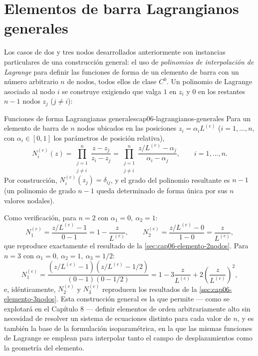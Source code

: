 \section{Elementos de barra Lagrangianos generales}
\label{sec:cap06-lagrangianos}

Los casos de dos y tres nodos desarrollados anteriormente son instancias particulares de una construcción general: el uso de \emph{polinomios de interpolación de Lagrange} para definir las funciones de forma de un elemento de barra con un número arbitrario $n$ de nodos, todos ellos de clase $C^0$. Un polinomio de Lagrange asociado al nodo $i$ se construye exigiendo que valga $1$ en $z_i$ y $0$ en los restantes $n-1$ nodos $z_j$ ($j\neq i$):

\begin{ecnimportante}{Funciones de forma Lagrangianas generales}{cap06-lagrangianos-generales}
Para un elemento de barra de $n$ nodos ubicados en las posiciones $z_i = \alpha_i L^{(e)}$ ($i=1,\dots,n$, con $\alpha_i\in[0,1]$ los parámetros de posición relativa),
\[
N_i^{(e)}(z) = \prod_{\substack{j=1 \\ j\neq i}}^{n} \frac{z-z_j}{z_i-z_j} = \prod_{\substack{j=1\\j\neq i}}^{n} \frac{z/L^{(e)}-\alpha_j}{\alpha_i-\alpha_j}, \qquad i=1,\dots,n .
\]
Por construcción, $N_i^{(e)}(z_j)=\delta_{ij}$, y el grado del polinomio resultante es $n-1$ (un polinomio de grado $n-1$ queda determinado de forma única por sus $n$ valores nodales).
\end{ecnimportante}

Como verificación, para $n=2$ con $\alpha_1=0,\ \alpha_2=1$:
\[
N_1^{(e)} = \frac{z/L^{(e)}-1}{0-1} = 1-\frac{z}{L^{(e)}}, \qquad N_2^{(e)}=\frac{z/L^{(e)}-0}{1-0}=\frac{z}{L^{(e)}} ,
\]
que reproduce exactamente el resultado de la \cref{sec:cap06-elemento-2nodos}. Para $n=3$ con $\alpha_1=0,\ \alpha_2=1,\ \alpha_3=1/2$:
\[
N_1^{(e)} = \frac{\left(z/L^{(e)}-1\right)\left(z/L^{(e)}-1/2\right)}{(0-1)(0-1/2)} = 1-3\frac{z}{L^{(e)}}+2\left(\frac{z}{L^{(e)}}\right)^2 ,
\]
e, idénticamente, $N_2^{(e)}$ y $N_3^{(e)}$ reproducen los resultados de la \cref{sec:cap06-elemento-3nodos}. Esta construcción general es la que permite --- como se explotará en el Capítulo 8 --- definir elementos de orden arbitrariamente alto sin necesidad de resolver un sistema de ecuaciones distinto para cada valor de $n$, y es también la base de la formulación isoparamétrica, en la que las mismas funciones de Lagrange se emplean para interpolar tanto el campo de desplazamientos como la geometría del elemento.


